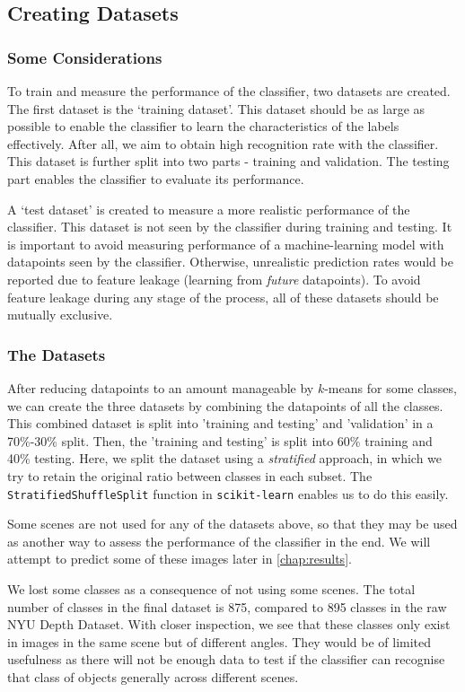 \subsection{Creating Datasets} \label{ssec:creating-datasets}
\subsubsection*{Some Considerations}
To train and measure the performance of the classifier, two datasets are created. The first dataset is the `training dataset'. This dataset should be as large as possible to enable the classifier to learn the characteristics of the labels effectively. After all, we aim to obtain high recognition rate with the classifier. This dataset is further split into two parts - training and validation. The testing part enables the classifier to evaluate its performance.

A `test dataset' is created to measure a more realistic performance of the classifier. This dataset is not seen by the classifier during training and testing. It is important to avoid measuring performance of a machine-learning model with datapoints seen by the classifier. Otherwise, unrealistic prediction rates would be reported due to feature leakage (learning from \textit{future} datapoints). To avoid feature leakage during any stage of the process, all of these datasets should be mutually exclusive.

\subsubsection*{The Datasets} 
After reducing datapoints to an amount manageable by $k$-means for some classes, we can create the three datasets by combining the datapoints of all the classes. This combined dataset is split into 'training and testing' and 'validation' in a 70\%-30\% split. Then, the 'training and testing' is split into 60\% training and 40\% testing. Here, we split the dataset using a \textit{stratified} approach, in which we try to retain the original ratio between classes in each subset. The \texttt{StratifiedShuffleSplit} function in \texttt{scikit-learn} enables us to do this easily.

Some scenes are not used for any of the datasets above, so that they may be used as another way to assess the performance of the classifier in the end. We will attempt to predict some of these images later in \autoref{chap:results}.

We lost some classes as a consequence of not using some scenes. The total number of classes in the final dataset is 875, compared to 895 classes in the raw NYU Depth Dataset. With closer inspection, we see that these classes only exist in images in the same scene but of different angles. They would be of limited usefulness as there will not be enough data to test if the classifier can recognise that class of objects generally across different scenes.

